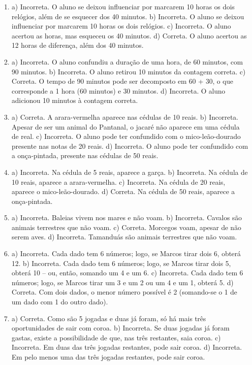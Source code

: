 \begin{enumerate}
\item
a) Incorreta. O aluno se deixou influenciar por marcarem 10 horas os
dois relógios, além de se esquecer dos 40 minutos.
b) Incorreta. O aluno se deixou influenciar por marcarem 10 horas os
dois relógios.
c) Incorreta. O aluno acertou as horas, mas esqueceu os 40 minutos.
d) Correta. O aluno acertou as 12 horas de diferença, além dos 40
minutos.

\item
a) Incorreta. O aluno confundiu a duração de uma hora, de 60 minutos, com
90 minutos.
b) Incorreta. O aluno retirou 10 minutos da contagem correta.
c) Correta. O tempo de 90 minutos pode ser decomposto em 60 + 30, o que corresponde a 1 hora (60 minutos) e 30 minutos.
d) Incorreta. O aluno adicionou 10 minutos à contagem correta.

\item
a) Correta. A arara-vermelha aparece nas cédulas de 10 reais.
b) Incorreta. Apesar de ser um animal do Pantanal, o jacaré não aparece em uma cédula de real.
c) Incorreta. O aluno pode ter confundido com o mico-leão-dourado
presente nas notas de 20 reais.
d) Incorreta. O aluno pode ter confundido com a onça-pintada, presente
nas cédulas de 50 reais.

\item
a) Incorreta. Na cédula de 5 reais, aparece a garça.
b) Incorreta. Na cédula de 10 reais, aparece a arara-vermelha.
c) Incorreta. Na cédula de 20 reais, aparece o mico-leão-dourado.
d) Correta. Na cédula de 50 reais, aparece a onça-pintada.

\item
a) Incorreta. Baleias vivem nos mares e não voam.
b) Incorreta. Cavalos são animais terrestres que não voam.
c) Correta. Morcegos voam, apesar de não serem aves.
d) Incorreta. Tamanduás são animais terrestres que não voam.

\item
a) Incorreta. Cada dado tem 6 números; logo, se Marcos tirar dois 6,
obterá 12.
b) Incorreta. Cada dado tem 6 números; logo, se Marcos tirar dois 5,
obterá 10 -- ou, então, somando um 4 e um 6.
c) Incorreta. Cada dado tem 6 números; logo, se Marcos tirar um 3 e um
2 ou um 4 e um 1, obterá 5.
d) Correta. Com dois dados, o menor número possível é 2 (somando-se o 1 de um dado com 1 do outro dado).

\item
a) Correta. Como são 5 jogadas e duas já foram, só há mais
três oportunidades de sair com coroa.
b) Incorreta. Se duas jogadas já foram gastas, existe a possibilidade de que, nas três restantes, saia coroa.
c) Incorreta. Em duas das três jogadas restantes, pode sair coroa.
d) Incorreta. Em pelo menos uma das três jogadas restantes, pode sair coroa.


\end{enumerate}
